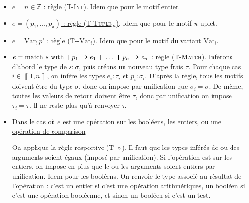 \documentclass[11pt]{article}
\begin{document}
\begin{itemize}
\begin{itemize}
        \item \underline{$e=n\in\mathbb{Z}$ : règle ({\scshape{T-Int}})}. Idem que pour le motif entier.
        \item \underline{$e=(p_1, \dots, p_n)$ : règle ({\scshape{T-Tuple}}$\,_n$)}. Idem que pour le motif $n$-uplet.
        \item \underline{$e=\text{Var}_i~p'$ : règle ({\scshape{T-}}-$\text{Var}_i$)}. Idem que pour le motif du variant $\text{Var}_i$.
        \item \underline{$e=\text{\lstinline|match|}~s~\text{\lstinline|with|}~\texttt{|}~p_1~\texttt{->}~e_1~\texttt{|}~\dots~\texttt{|}~p_n~\texttt{->}~e_n$ : règle ({\scshape{T-Match}})}. Inférons d'abord le type de $s:\sigma$, puis créons un nouveau type frais $\tau$. Pour chaque cas $i\in\left\llbracket1, n\right\rrbracket$, on infère les types $e_i:\tau_i$ et $p_i:\sigma_i$. D'après la règle, tous les motifs doivent être du type $\sigma$, donc on impose par unification que $\sigma_i=\sigma$. De même, toutes les valeurs de retour doivent être $\tau$, donc par unification on impose $\tau_i=\tau$. Il ne reste plus qu'à renvoyer $\tau$.
        \item \underline{Dans le cas où $e$ est une opération sur les booléens, les entiers, ou une opération de comparison}
        
        On applique la règle respective ({\scshape{T-$\diamond$}}). Il faut que les types inférés de ou des arguments soient égaux (imposé par unification). Si l'opération est sur les entiers, on impose en plus que le ou les arguments soient entiers par unification. Idem pour les booléens. On renvoie le type associé au résultat de l'opération : c'est un entier si c'est une opération arithmétiques, un booléen si c'est une opération booléenne, et sinon un booléen si c'est un test.
    \end{itemize}
\end{itemize}
\end{document}
